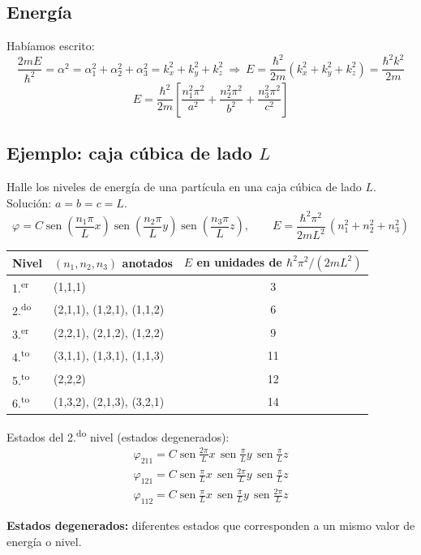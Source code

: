 \documentclass[11pt,a4paper]{article}
\DeclareMathOperator{\sen}{sen}
\begin{document}
\subsection{Energía}
Habíamos escrito:
\[
\frac{2mE}{\hbar^2}=\alpha^2=\alpha_1^2+\alpha_2^2+\alpha_3^2=k_x^2+k_y^2+k_z^2
\ \Rightarrow\
E=\frac{\hbar^2}{2m}(k_x^2+k_y^2+k_z^2)=\frac{\hbar^2k^2}{2m}
\]
\[
\boxed{E=\frac{\hbar^2}{2m}\left[\frac{n_1^2\pi^2}{a^2}+\frac{n_2^2\pi^2}{b^2}+\frac{n_3^2\pi^2}{c^2}\right]}
\]

\subsection{Ejemplo: caja cúbica de lado $L$}
Halle los niveles de energía de una partícula en una caja cúbica de lado $L$. Solución: $a=b=c=L$.
\[
\varphi=C\sen\!\left(\frac{n_1\pi}{L}x\right)\sen\!\left(\frac{n_2\pi}{L}y\right)\sen\!\left(\frac{n_3\pi}{L}z\right),\qquad
E=\frac{\hbar^2\pi^2}{2mL^2}\,(n_1^2+n_2^2+n_3^2)
\]

\begin{center}
\begin{tabular}{llc}
\toprule
Nivel & $(n_1,n_2,n_3)$ anotados & $E$ en unidades de $\hbar^2\pi^2/(2mL^2)$\\
\midrule
1.\textsuperscript{er} & (1,1,1) & 3\\
2.\textsuperscript{do} & (2,1,1), (1,2,1), (1,1,2) & 6\\
3.\textsuperscript{er} & (2,2,1), (2,1,2), (1,2,2) & 9\\
4.\textsuperscript{to} & (3,1,1), (1,3,1), (1,1,3) & 11\\
5.\textsuperscript{to} & (2,2,2) & 12\\
6.\textsuperscript{to} & (1,3,2), (2,1,3), (3,2,1) & 14\\
\bottomrule
\end{tabular}
\end{center}

Estados del 2.\textsuperscript{do} nivel (estados degenerados):
\[
\begin{gathered}
\varphi_{211}=C\sen\tfrac{2\pi}{L}x\,\sen\tfrac{\pi}{L}y\,\sen\tfrac{\pi}{L}z\\
\varphi_{121}=C\sen\tfrac{\pi}{L}x\,\sen\tfrac{2\pi}{L}y\,\sen\tfrac{\pi}{L}z\\
\varphi_{112}=C\sen\tfrac{\pi}{L}x\,\sen\tfrac{\pi}{L}y\,\sen\tfrac{2\pi}{L}z
\end{gathered}
\]

\textbf{Estados degenerados:} diferentes estados que corresponden a un mismo valor de energía o nivel.
\end{document}
